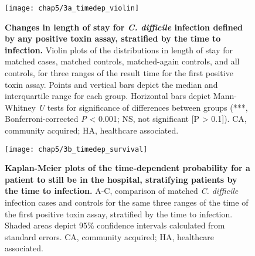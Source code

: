 \begin{figure}[htb]
  \texttt{[image: chap5/3a\_timedep\_violin]}
  \caption[Changes in length of stay for \emph{C. difficile} infection defined by any positive toxin assay and stratified by the time to infection]{
    \textbf{Changes in length of stay for \emph{C. difficile} infection defined by any positive toxin assay, stratified by the time to infection.} Violin plots of the distributions in length of stay for matched cases, matched controls, matched-again controls, and all controls, for three ranges of the result time for the first positive toxin assay. Points and vertical bars depict the median and interquartile range for each group. Horizontal bars depict Mann-Whitney \emph{U} tests for significance of differences between groups (***, Bonferroni-corrected \emph{P} < 0.001; NS, not significant [P > 0.1]). CA, community acquired; HA, healthcare associated.
  }
  \label{fig:timedep_violin}
\end{figure}
\begin{figure}[htb]
  \texttt{[image: chap5/3b\_timedep\_survival]}
  \caption[Kaplan-Meier plots for length of stay, stratifying patients by the time to infection]{\textbf{Kaplan-Meier plots of the time-dependent probability for a patient to still be in the hospital, stratifying patients by the time to infection.} A-C, comparison of matched \emph{C. difficile} infection cases and controls for the same three ranges of the time of the first positive toxin assay, stratified by the time to infection. Shaded areas depict 95\% confidence intervals calculated from standard errors. CA, community acquired; HA, healthcare associated.
  }
  \label{fig:timedep_survival}
\end{figure}


